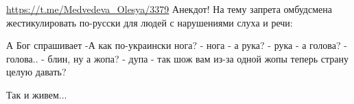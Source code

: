 
 
 
 
 

\url{https://t.me/Medvedeva_Olesya/3379}
Анекдот! На тему запрета омбудсмена жестикулировать по-русски для людей с нарушениями слуха и речи:

А Бог спрашивает
-А как по-украински нога?
- нога
- а рука?
- рука
- а голова?
- голова..
- блин, ну а жопа?
- дупа
- так шож вам из-за одной жопы теперь страну целую давать?

Так и живем...
